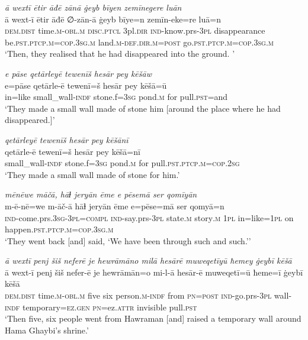\ea \label{BP.197}
\textit{ā wextī ētir āđē zānā ġeyb bīyen zemīnegere luān} \\ 
\gll ā wext-ī ētir āđē ∅-zān-ā ġeyb bīye=n zemīn-eke=re luā=n \\ 
 \textsc{dem.dist} time\textsc{.m}\textsc{-obl}\textsc{.m} \textsc{disc.ptcl} 3pl\textsc{.dir} \textsc{ind-}know.prs\textsc{-3pl} disappearance be\textsc{.pst}\textsc{.ptcp}\textsc{.m}\textsc{=cop}\textsc{.3sg}\textsc{.m} land\textsc{.m}\textsc{-def}\textsc{.dir}\textsc{.m}\textsc{=\textsc{post}} go\textsc{.pst}\textsc{.ptcp}\textsc{.m}\textsc{=cop}\textsc{.3sg}\textsc{.m} \\ 
\glt `Then, they realised that he had disappeared into the ground. '
\z 
 
\ea \label{BP.198}
\textit{e pāse qetārleyē tewenīš hesār pey kēšāw} \\ 
\gll e=pāse qetārle-ē tewenī=š hesār pey kēšā=ū \\ 
 in=like small\_wall\textsc{-indf} stone.f\textsc{=3sg} pond\textsc{.m} for pull\textsc{.pst}=and \\ 
\glt `They made a small wall made of stone him [around the place where he had disappeared.]'
\z 
 
\ea \label{BP.199}
\textit{qetārleyē tewenīš hesār pey kēšānī} \\ 
\gll qetārle-ē tewenī=š hesār pey kēšā=nī \\ 
 small\_wall\textsc{-indf} stone.f\textsc{=3sg} pond\textsc{.m} for pull\textsc{.pst}\textsc{.ptcp}\textsc{.m}\textsc{=cop}\textsc{.\textsc{2sg}} \\ 
\glt `They made a small wall made of stone for him.'
\z 
 
\ea \label{BP.202}
\textit{mēnēwe māčā, hāɫ jeryān ēme e pēsemā ser qomīyān} \\ 
\gll m-ē-nē=we m-āč-ā hāɫ jeryān ēme e=pēse=mā ser qomyā=n \\ 
 \textsc{ind-}come.prs\textsc{.3sg}\textsc{-3pl}\textsc{=compl} \textsc{ind-}say.prs\textsc{-3pl} state\textsc{.m} story\textsc{.m} \textsc{1pl} in=like\textsc{=\textsc{1pl}} on happen\textsc{.pst}\textsc{.ptcp}\textsc{.m}\textsc{=cop}\textsc{.3sg}\textsc{.m} \\ 
\glt `They went back [and] said, ‘We have been through such and such.’'
\z 
 
\ea \label{BP.203}
\textit{ā wextī penj šiš neferē je hewrāmāno milā hesārē muweqetīyū ħemey ġeybī kēšā} \\ 
\gll ā wext-ī penj šiš nefer-ē je hewrāmān=o mi-l-ā hesār-ē muweqetī=ū ħeme=ī ġeybī kēšā \\ 
 \textsc{dem.dist} time\textsc{.m}\textsc{-obl}\textsc{.m} five six person\textsc{.m}\textsc{-indf} from \textsc{pn}\textsc{=\textsc{post}} \textsc{ind-}go.prs\textsc{-3pl} wall\textsc{-indf} temporary\textsc{=ez.gen} \textsc{pn}=ez.\textsc{attr} invisible pull\textsc{.pst} \\ 
\glt `Then five, six people went from Hawraman [and] raised a temporary wall around Hama Ghaybi’s shrine.'
\z 
 

